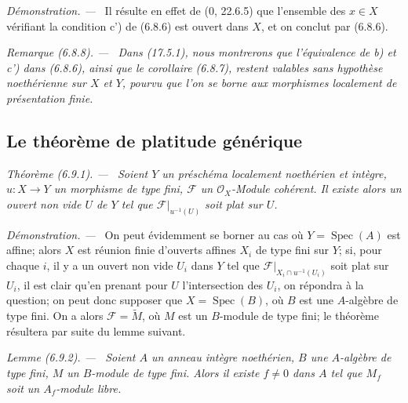 \documentclass[10pt,oneside]{book}
\newenvironment{theorem}[1][]{%
  \par\medskip\noindent\itshape Théorème (#1). ---\ }{\par}
\newenvironment{remark}[1][]{%
  \par\medskip\noindent\itshape Remarque (#1). ---\ }{\par}
\newenvironment{lemma}[1][]{%
  \par\medskip\noindent\itshape Lemme (#1). ---\ }{\par}
\newenvironment{proof}{%
  \par\medskip\noindent\textit{Démonstration. ---\ }}{\par}
\begin{document}
\begin{proof}
Il résulte en effet de (0, 22.6.5) que l'ensemble des $x\in X$ vérifiant la
condition c') de (6.8.6) est ouvert dans $X$, et on conclut par (6.8.6).
\end{proof}

\begin{remark}[6.8.8]
\label{IV.2.s6.8.8-fr}
Dans (17.5.1), nous montrerons que l'équivalence de b) et c') dans (6.8.6),
ainsi que le corollaire (6.8.7), restent valables sans hypothèse noethérienne
sur $X$ et $Y$, pourvu que l'on se borne aux morphismes localement de
présentation finie.
\end{remark}

\subsection{Le théorème de platitude générique}
\label{subsection:IV.6.9}

\begin{theorem}[6.9.1]
\label{IV.2.s6.9.1-fr}
Soient $Y$ un préschéma localement noethérien et intègre, $u:X\to Y$ un
morphisme de type fini, $\mathcal F$ un $\mathcal O_X$-Module cohérent. Il
existe alors un ouvert non vide $U$ de $Y$ tel que
$\mathcal F|_{u^{-1}(U)}$ soit plat sur $U$.
\end{theorem}

\begin{proof}
On peut évidemment se borner au cas où $Y=\operatorname{Spec}(A)$ est affine;
alors $X$ est réunion finie d'ouverts affines $X_i$ de type fini sur $Y$; si,
pour chaque $i$, il y a un ouvert non vide $U_i$ dans $Y$ tel que
$\mathcal F|_{X_i\cap u^{-1}(U_i)}$ soit plat sur $U_i$, il est clair qu'en
prenant pour $U$ l'intersection des $U_i$, on répondra à la question; on peut
donc supposer que $X=\operatorname{Spec}(B)$, où $B$ est une $A$-algèbre de
type fini. On a alors $\mathcal F=\widetilde M$, où $M$ est un $B$-module de
type fini; le théorème résultera par suite du lemme suivant.
\end{proof}

\begin{lemma}[6.9.2]
\label{IV.2.s6.9.2-fr}
Soient $A$ un anneau intègre noethérien, $B$ une $A$-algèbre de type fini,
$M$ un $B$-module de type fini. Alors il existe $f\ne0$ dans $A$ tel que
$M_f$ soit un $A_f$-module libre.
\end{lemma}
\end{document}
